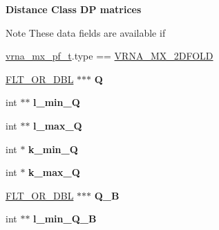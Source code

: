 \begin{Indent}{\bf Distance Class D\-P matrices}\par
{\em \begin{DoxyNote}{Note}
These data fields are available if 
\begin{DoxyCode}
\hyperlink{group__dp__matrices_structvrna__mx__pf__s}{vrna\_mx\_pf\_t}.type == \hyperlink{group__dp__matrices_gga6042ea1d58d01931e959791be6d89343ae656f8391445ff71bed8a597a0a19417}{VRNA\_MX\_2DFOLD} 
\end{DoxyCode}
 
\end{DoxyNote}
}\begin{DoxyCompactItemize}
\item 
\hypertarget{group__dp__matrices_a29678f1d17a805ce2c80d765e00f694d}{\hyperlink{group__data__structures_ga31125aeace516926bf7f251f759b6126}{F\-L\-T\-\_\-\-O\-R\-\_\-\-D\-B\-L} $\ast$$\ast$$\ast$ {\bfseries Q}}\label{group__dp__matrices_a29678f1d17a805ce2c80d765e00f694d}

\item 
\hypertarget{group__dp__matrices_a13ccc584739950bcd6de23925a9afe0e}{int $\ast$$\ast$ {\bfseries l\-\_\-min\-\_\-\-Q}}\label{group__dp__matrices_a13ccc584739950bcd6de23925a9afe0e}

\item 
\hypertarget{group__dp__matrices_ac136ef6871aad05b013aaec2a4cc9298}{int $\ast$$\ast$ {\bfseries l\-\_\-max\-\_\-\-Q}}\label{group__dp__matrices_ac136ef6871aad05b013aaec2a4cc9298}

\item 
\hypertarget{group__dp__matrices_aa09c7b59d39b4b669173330976ae4798}{int $\ast$ {\bfseries k\-\_\-min\-\_\-\-Q}}\label{group__dp__matrices_aa09c7b59d39b4b669173330976ae4798}

\item 
\hypertarget{group__dp__matrices_a6405e58faa7aac0d7fd7bf6fc2821b99}{int $\ast$ {\bfseries k\-\_\-max\-\_\-\-Q}}\label{group__dp__matrices_a6405e58faa7aac0d7fd7bf6fc2821b99}

\item 
\hypertarget{group__dp__matrices_a7bf41bf6ce96a6a6ffad912a6bb9f023}{\hyperlink{group__data__structures_ga31125aeace516926bf7f251f759b6126}{F\-L\-T\-\_\-\-O\-R\-\_\-\-D\-B\-L} $\ast$$\ast$$\ast$ {\bfseries Q\-\_\-\-B}}\label{group__dp__matrices_a7bf41bf6ce96a6a6ffad912a6bb9f023}

\item 
\hypertarget{group__dp__matrices_aa6ab6ade9a4f4aa347ea1ac3d780bbf4}{int $\ast$$\ast$ {\bfseries l\-\_\-min\-\_\-\-Q\-\_\-\-B}}\label{group__dp__matrices_aa6ab6ade9a4f4aa347ea1ac3d780bbf4}


\end{DoxyCompactItemize}
\end{Indent}
